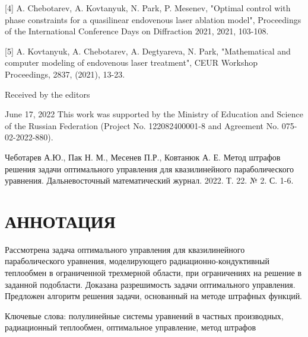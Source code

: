 \documentclass[10pt]{article}
\begin{document}
[4] A. Chebotarev, A. Kovtanyuk, N. Park, P. Mesenev, "Optimal control with phase constraints for a quasilinear endovenous laser ablation model", Proceedings of the International Conference Days on Diffraction 2021, 2021, 103-108.

[5] A. Kovtanyuk, A. Chebotarev, A. Degtyareva, N. Park, "Mathematical and computer modeling of endovenous laser treatment", CEUR Workshop Proceedings, 2837, (2021), 13-23.

Received by the editors

June 17, 2022 This work was supported by the Ministry of Education and Science of the Russian Federation (Project No. 122082400001-8 and Agreement No. 075-02-2022-880).

Чеботарев А.Ю., Пак Н. М., Месенев П.Р., Ковтанюк А. Е. Метод штрафов решения задачи оптимального управления для квазилинейного параболического уравнения. Дальневосточный математический журнал. 2022. Т. 22. № 2. С. 1-6.

\section{АННОТАЦИЯ}
Рассмотрена задача оптимального управления для квазилинейного параболического уравнения, моделирующего радиационно-кондуктивный теплообмен в ограниченной трехмерной области, при ограничениях на решение в заданной подобласти. Доказана разрешимость задачи оптимального управления. Предложен алгоритм решения задачи, основанный на методе штрафных функций.

Ключевые слова: полулинейные системы уравнений в частных производных, радиационный теплообмен, оптимальное управление, метод штрафов
\end{document}
